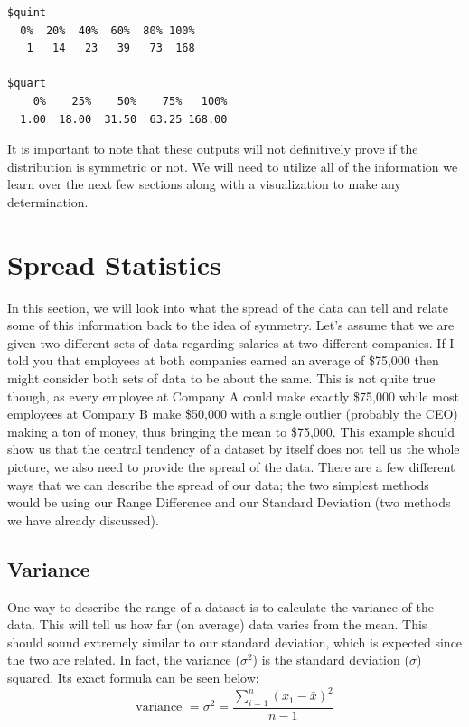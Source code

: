 \documentclass[
  letterpaper,
  DIV=11,
  numbers=noendperiod]{scrreprt}
\newenvironment{Shaded}{\begin{snugshade}}{\end{snugshade}}
\newcommand{\FunctionTok}[1]{\textcolor[rgb]{0.28,0.35,0.67}{#1}}
\newcommand{\NormalTok}[1]{\textcolor[rgb]{0.00,0.23,0.31}{#1}}
\newcommand{\SpecialCharTok}[1]{\textcolor[rgb]{0.37,0.37,0.37}{#1}}
\begin{document}
\begin{Shaded}
\end{Shaded}

\begin{verbatim}
$quint
  0%  20%  40%  60%  80% 100% 
   1   14   23   39   73  168 

$quart
    0%    25%    50%    75%   100% 
  1.00  18.00  31.50  63.25 168.00 
\end{verbatim}

It is important to note that these outputs will not definitively prove
if the distribution is symmetric or not. We will need to utilize all of
the information we learn over the next few sections along with a
visualization to make any determination.

\section{Spread Statistics}\label{spread-statistics}

In this section, we will look into what the spread of the data can tell
and relate some of this information back to the idea of symmetry. Let's
assume that we are given two different sets of data regarding salaries
at two different companies. If I told you that employees at both
companies earned an average of \$75,000 then might consider both sets of
data to be about the same. This is not quite true though, as every
employee at Company A could make exactly \$75,000 while most employees
at Company B make \$50,000 with a single outlier (probably the CEO)
making a ton of money, thus bringing the mean to \$75,000. This example
should show us that the central tendency of a dataset by itself does not
tell us the whole picture, we also need to provide the spread of the
data. There are a few different ways that we can describe the spread of
our data; the two simplest methods would be using our Range Difference
and our Standard Deviation (two methods we have already discussed).

\subsection{Variance}\label{variance}

One way to describe the range of a dataset is to calculate the variance
of the data. This will tell us how far (on average) data varies from the
mean. This should sound extremely similar to our standard deviation,
which is expected since the two are related. In fact, the variance
(\(\sigma^2\)) is the standard deviation (\(\sigma\)) squared. Its exact
formula can be seen below:
\[ \text{variance } = \sigma^2 = \frac{\sum_{i=1}^n (x_1-\bar{x})^2}{n-1}\]
\end{document}
